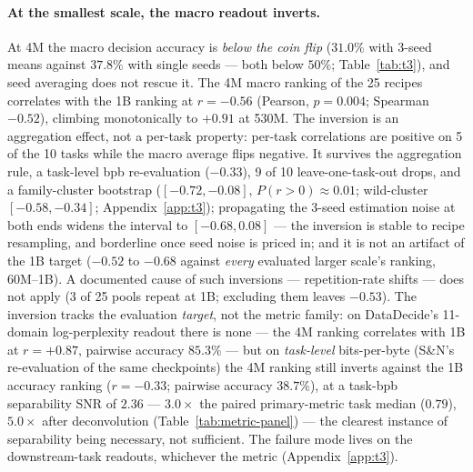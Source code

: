 \paragraph{At the smallest scale, the macro readout inverts.}
\label{sec:t3-inversion}
At 4M the macro decision accuracy is \emph{below the coin flip} ($31.0\%$ with 3-seed means
against $37.8\%$ with single seeds --- both below $50\%$; Table~\ref{tab:t3}), and seed
averaging does not rescue it. The 4M macro
ranking of the 25 recipes correlates with the 1B ranking at $r = -0.56$ (Pearson, $p = 0.004$;
Spearman $-0.52$), climbing monotonically to $+0.91$ at 530M. The inversion is an aggregation
effect, not a per-task property: per-task correlations are positive on 5 of the
10 tasks while the macro average flips negative. It survives the aggregation
rule, a task-level bpb re-evaluation ($-0.33$), 9 of 10 leave-one-task-out drops, and a
family-cluster bootstrap ($[-0.72, -0.08]$, $P(r{>}0)\approx0.01$; wild-cluster
$[-0.58, -0.34]$; Appendix~\ref{app:t3}); propagating the 3-seed
estimation noise at both ends widens the interval to $[-0.68, 0.08]$ --- the inversion is
stable to recipe resampling, and borderline once seed noise is priced in; and it is not an
artifact of the 1B target ($-0.52$ to $-0.68$ against \emph{every} evaluated larger scale's ranking, 60M--1B). A documented cause of such inversions --- repetition-rate shifts
\citep{zhou2026repetition} --- does not apply (3 of 25 pools repeat at 1B; excluding them
leaves $-0.53$). The inversion tracks the
evaluation \emph{target}, not the metric
family: on DataDecide's 11-domain log-perplexity readout there is none --- the 4M
ranking correlates with 1B at $r = +0.87$, pairwise accuracy $85.3\%$ --- but on
\emph{task-level} bits-per-byte (S\&N's re-evaluation of the same checkpoints) the 4M ranking still inverts against the 1B accuracy ranking ($r = -0.33$; pairwise
accuracy $38.7\%$), at a task-bpb separability SNR of $2.36$ --- $3.0\times$ the paired
primary-metric task median ($0.79$), $5.0\times$ after deconvolution
(Table~\ref{tab:metric-panel}) --- the clearest instance of separability
being necessary, not sufficient. The failure mode lives on the downstream-task readouts,
whichever the metric
(Appendix~\ref{app:t3}).

